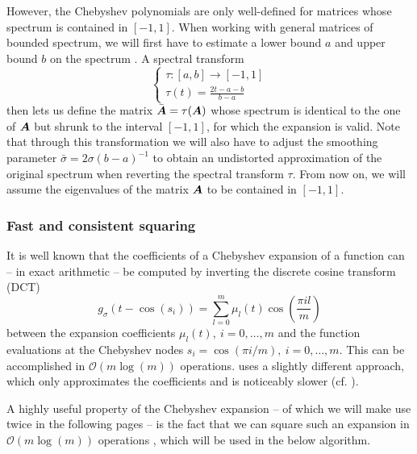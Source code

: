 \documentclass[12pt]{article}
\begin{document}
However, the Chebyshev polynomials are only well-defined for matrices whose spectrum is contained in $[-1, 1]$. When working with general matrices of bounded spectrum, we will first have to estimate a lower bound $a$ and upper bound $b$ on the spectrum \cite{zhou-2011-bounding-spectrum}. A spectral transform
\begin{equation}
    \begin{cases}
        \tau : [a, b] \to [-1, 1]\\
        \tau(t) = \frac{2t - a - b}{b - a}
    \end{cases}
\end{equation}
then lets us define the matrix $\bar{\boldsymbol{A}} = \tau(\boldsymbol{A})$ whose spectrum is identical to the one of $\boldsymbol{A}$ but shrunk to the interval $[-1, 1]$, for which the expansion  is valid. Note that through this transformation we will also have to adjust the smoothing parameter $\bar{\sigma} = 2 \sigma (b - a)^{-1}$ to obtain an undistorted approximation of the original spectrum when reverting the spectral transform $\tau$. From now on, we will assume the eigenvalues of the matrix $\boldsymbol{A}$ to be contained in $[-1, 1]$.

\subsubsection{Fast and consistent squaring}
\label{subsubsec:dct}

It is well known that the coefficients of a Chebyshev expansion of a function can -- in exact arithmetic -- be computed by inverting the discrete cosine transform (DCT)
\begin{equation}
    g_{\sigma}(t - \cos(s_i)) = \sum_{l=0}^{m} \mu_l(t) \cos\left(\frac{\pi i l}{m} \right)
    \label{equ:discrete-cosine-transform}
\end{equation}
between the expansion coefficients $\mu_l(t),~i=0,\dots,m$ and the function evaluations at the Chebyshev nodes $s_i = \cos(\pi i / m),~i=0,\dots,m$. This can be accomplished in $\mathcal{O}(m \log(m))$ operations. \cite[algorithm 1]{lin-2017-randomized-estimation} uses a slightly different approach, which only approximates the coefficients and is noticeably slower (cf. ).

A highly useful property of the Chebyshev expansion -- of which we will make use twice in the following pages -- is the fact that we can square such an expansion in $\mathcal{O}(m \log(m))$ operations \cite{baszenski-1997-fast-polynomial}, which will be used in the below algorithm.
\end{document}
